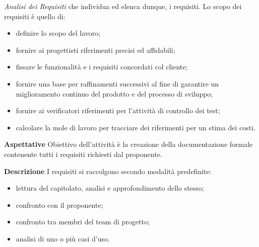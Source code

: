 \textit{Analisi dei Requisiti} che individua ed elenca dunque, i requisiti.
Lo scopo dei requisiti è quello di:
	\begin{itemize}
		\item definire lo scopo del lavoro;
		\item fornire ai progettisti riferimenti precisi ed affidabili;
		\item fissare le funzionalità e i requisiti concordati col cliente;
		\item fornire  una  base  per  raffinamenti  successivi  al  fine  di  
			garantire  un miglioramento continuo del prodotto e del processo di sviluppo;
		\item fornire ai verificatori riferimenti per l'attività di controllo dei 
			test;
		\item calcolare la mole di lavoro per tracciare dei riferimenti per un stima 
			dei costi.
	\end{itemize}
	
\textbf{Aspettative} \newline \newline
Obiettivo dell'attività è la creazione della documentazione formale 
contenente tutti i requisiti richiesti dal proponente. \newline \newline
			
\textbf{Descrizione} \newline \newline
I requisiti si raccolgono secondo modalità predefinite:
	\begin{itemize}
		\item lettura del capitolato\glo, analisi e approfondimento dello stesso;
		\item confronto con il proponente;
		\item confronto tra membri del team di progetto;
		\item analisi di uno o più casi d'uso.  \\
	\end{itemize}
	
